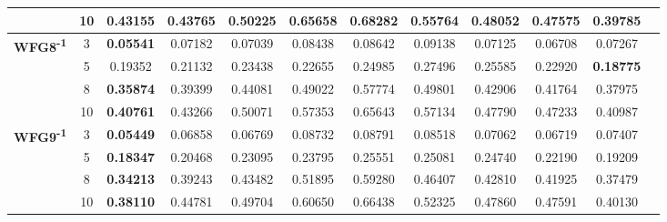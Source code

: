 \documentclass{sig-alternate}
\begin{document}
\begin{table}[!htb]
\begin{tabular}{|c|c|c|c|c|c|c|c|c|c|c|c|}
                                                      & 10         & 0.43155          & 0.43765           & 0.50225               & 0.65658          & 0.68282             & 0.55764             & 0.48052            & 0.47575              & \textbf{0.39785} \\ \hline
\multirow{4}{*}{\textbf{WFG8\textsuperscript{-1}}}  & 3          & \textbf{0.05541} & 0.07182           & 0.07039               & 0.08438          & 0.08642             & 0.09138             & 0.07125            & 0.06708              & 0.07267          \\ \cline{2-11} 
                                                      & 5          & 0.19352          & 0.21132           & 0.23438               & 0.22655          & 0.24985             & 0.27496             & 0.25585            & 0.22920              & \textbf{0.18775} \\ \cline{2-11} 
                                                      & 8          & \textbf{0.35874} & 0.39399           & 0.44081               & 0.49022          & 0.57774             & 0.49801             & 0.42906            & 0.41764              & 0.37975          \\ \cline{2-11} 
                                                      & 10         & \textbf{0.40761} & 0.43266           & 0.50071               & 0.57353          & 0.65643             & 0.57134             & 0.47790            & 0.47233              & 0.40987          \\ \hline
\multirow{4}{*}{\textbf{WFG9\textsuperscript{-1}}}  & 3          & \textbf{0.05449} & 0.06858           & 0.06769               & 0.08732          & 0.08791             & 0.08518             & 0.07062            & 0.06719              & 0.07407          \\ \cline{2-11} 
                                                      & 5          & \textbf{0.18347} & 0.20468           & 0.23095               & 0.23795          & 0.25551             & 0.25081             & 0.24740            & 0.22190              & 0.19209          \\ \cline{2-11} 
                                                      & 8          & \textbf{0.34213} & 0.39243           & 0.43482               & 0.51895          & 0.59280             & 0.46407             & 0.42810            & 0.41925              & 0.37479          \\ \cline{2-11} 
                                                      & 10         & \textbf{0.38110} & 0.44781           & 0.49704               & 0.60650          & 0.66438             & 0.52325             & 0.47860            & 0.47591              & 0.40130          \\ \hline
	\end{tabular}
\end{table}
 
\end{document}
